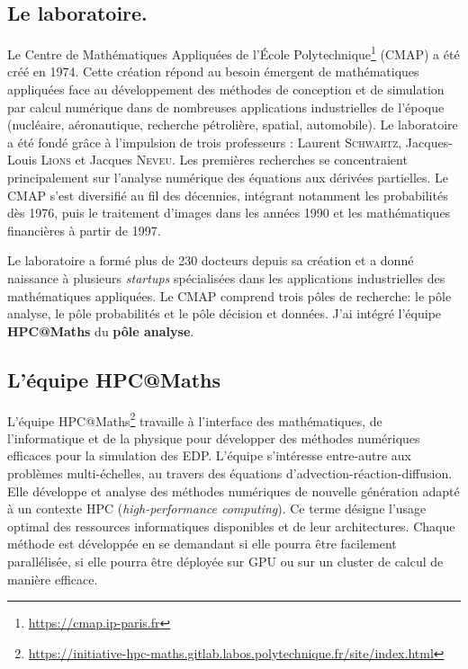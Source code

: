\subsection{Le laboratoire.}
Le Centre de Mathématiques Appliquées de l'École Polytechnique\footnote{\href{https://cmap.ip-paris.fr}{https://cmap.ip-paris.fr}} (CMAP) a été créé en 1974.
Cette création répond au besoin émergent de mathématiques appliquées face au développement des méthodes de conception et de simulation par calcul numérique dans de nombreuses applications industrielles de l'époque (nucléaire, aéronautique, recherche pétrolière, spatial, automobile).
Le laboratoire a été fondé grâce à l'impulsion de trois professeurs : Laurent \textsc{Schwartz}, Jacques-Louis \textsc{Lions} et Jacques \textsc{Neveu}.
Les premières recherches se concentraient principalement sur l'analyse numérique des équations aux dérivées partielles.
Le CMAP s'est diversifié au fil des décennies, intégrant notamment les probabilités dès 1976, puis le traitement d'images dans les années 1990 et les mathématiques financières à partir de 1997. 

Le laboratoire a formé plus de 230 docteurs depuis sa création et a donné naissance à plusieurs \textit{startups} spécialisées dans les applications industrielles des mathématiques appliquées.
Le CMAP comprend trois pôles  de recherche: le pôle analyse, le pôle probabilités et le pôle décision et données.
J'ai intégré l'équipe \textbf{HPC@Maths} du \textbf{pôle analyse}.
\subsection{L'équipe HPC@Maths}
    L'équipe HPC@Maths\footnote{\href{https://initiative-hpc-maths.gitlab.labos.polytechnique.fr/site/index.html}{https://initiative-hpc-maths.gitlab.labos.polytechnique.fr/site/index.html}} 
    travaille à l'interface des mathématiques, de l'informatique et de la physique pour développer 
    des méthodes numériques efficaces pour la simulation des EDP. 
    L'équipe s'intéresse entre-autre aux problèmes multi-échelles, au travers des équations d'advection-réaction-diffusion.
    Elle développe et analyse des méthodes numériques de nouvelle génération adapté à un contexte HPC (\emph{high-performance computing}).
    Ce terme désigne l'usage optimal des ressources informatiques disponibles et de leur architectures. 
    Chaque méthode est développée en se demandant si elle pourra être facilement parallélisée, si elle pourra être déployée sur GPU ou sur un cluster de calcul de manière efficace. 